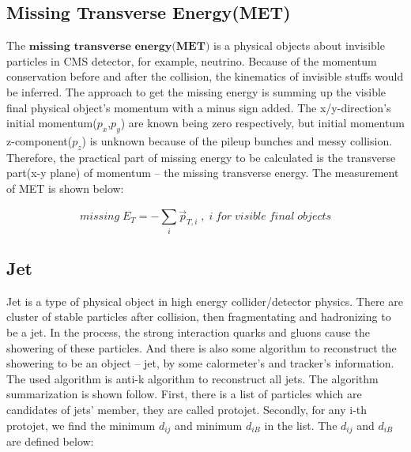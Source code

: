 	\subsection{Missing Transverse Energy(MET)}
	\label{ssec:PhysObj_met}
		The $\textbf{missing}$ $\textbf{transverse}$ $\textbf{energy}$$\textbf{(MET)}$ is a physical objects about invisible particles in CMS detector, for example, neutrino. Because of the momentum conservation before and after the collision, the kinematics of invisible stuffs would be inferred. The approach to get the missing energy is summing up the visible final physical object's momentum with a minus sign added. The x/y-direction's initial momentum($p_x$,$p_y$) are known being zero respectively, but initial momentum z-component($p_z$) is unknown because of the pileup bunches and messy collision. Therefore, the practical part of missing energy to be calculated is the transverse part(x-y plane) of momentum -- the missing transverse energy. The measurement of MET is shown below:

		\begin{equation}
		missing\;E_T = - \sum_{i}^{} \vec{p}_{T,i} \;, \; i\;for\;visible\;final\;objects
		\label{eq:MET}
		\end{equation}
		\FloatBarrier
		

	\subsection{Jet}
	\label{ssec:PhysObj_jet}


		Jet is a type of physical object in high energy collider/detector physics. There are cluster of stable particles after collision, then fragmentating and hadronizing to be a jet. In the process, the strong interaction quarks and gluons cause the showering of these particles. And there is also some algorithm to reconstruct the showering to be an object -- jet, by some calormeter's and tracker's information.
		The used algorithm is anti-k algorithm to reconstruct all jets. The algorithm summarization is shown follow. First, there is a list of particles which are candidates of jets' member, they are called protojet. Secondly, for any i-th protojet, we find the minimum $d_{ij}$ and minimum $d_{iB}$ in the list. The $d_{ij}$ and $d_{iB}$ are defined below:

